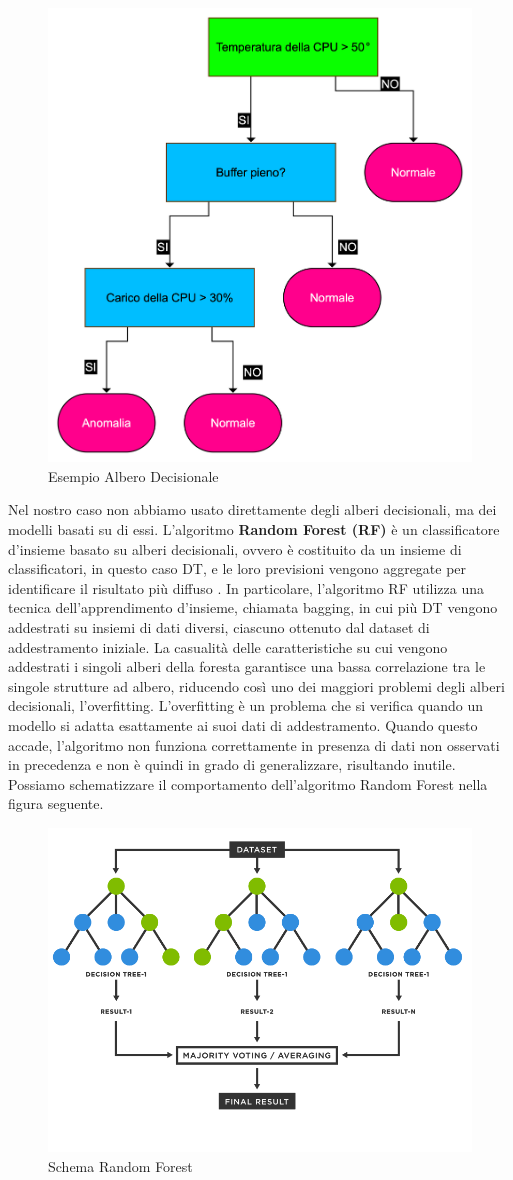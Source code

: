 \begin{figure}[H]
    \centering
    \includegraphics[width=0.6\linewidth]{Esempio DT.png}
    \caption{Esempio Albero Decisionale}
    \label{fig:enter-label}
\end{figure}

\vspace{1cm}

Nel nostro caso non abbiamo usato direttamente degli alberi decisionali, ma dei modelli basati su di essi. L'algoritmo \textbf{Random Forest (RF)} \`e un classificatore d'insieme basato su alberi decisionali, ovvero \`e costituito da un insieme di classificatori, in questo caso DT, e le loro previsioni vengono aggregate per identificare il risultato pi\`u diffuso \cite{rf}.
In particolare, l'algoritmo RF utilizza una tecnica dell'apprendimento d'insieme, chiamata bagging, in cui pi\`u DT vengono addestrati su insiemi di dati diversi, ciascuno ottenuto dal dataset di addestramento iniziale. La casualit\`a delle caratteristiche su cui vengono addestrati i singoli alberi della foresta garantisce una bassa correlazione tra le singole strutture ad albero, riducendo cos\`i uno dei maggiori problemi degli alberi decisionali, l'overfitting. 
L'overfitting \`e un problema che si verifica quando un modello si adatta esattamente ai suoi dati di addestramento. Quando questo accade, l'algoritmo non funziona correttamente in presenza di dati non osservati in precedenza e non \`e quindi in grado di generalizzare, risultando inutile.
Possiamo schematizzare il comportamento dell'algoritmo Random Forest nella figura seguente.

\begin{figure}[H]
    \centering
    \includegraphics[width=0.6\linewidth]{RF Diagramma.png}
    \caption{Schema Random Forest}
    \label{fig:enter-label}
\end{figure}

